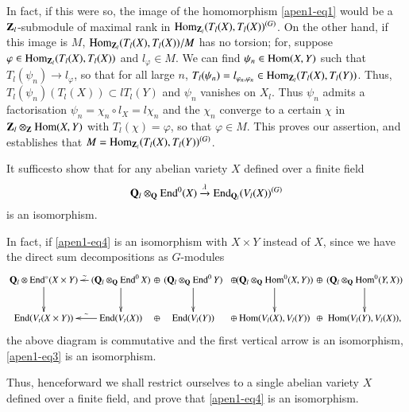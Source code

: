 In fact, if this were so, the image of the homomorphism \eqref{apen1-eq1} would be a $\mathbf{Z}_l$-submodule of maximal rank in $\operatorname{Hom}_{\mathbf{Z}_l} (T_l(X),T_l(X))^{(G)}$. On the other hand, if this image is $M$, $\operatorname{Hom}_{\mathbf{Z}_l} (T_l(X), T_l(X))/M$ has no torsion; for, suppose  $\varphi \in \operatorname{Hom}_{\mathbf{Z}_l} (T_l(X), T_l(X))$ and $l_\varphi \in M$. We can find $\psi_n \in \operatorname{Hom} (X,Y)$ such that $T_l(\psi_n) \to l_\varphi$, so that for all large $n$, $T_l (\psi_n) = l_{\varphi_n, \varphi_n} \in \operatorname{Hom}_{\mathbf{Z}_l} (T_l(X), T_l (Y))$. Thus, $T_l (\psi_n) (T_l (X)) \subset l T_l(Y)$ and $\psi_n$ vanishes on $X_l$. Thus $\psi_n$ admits a factorisation $\psi_n =\chi_n \circ l_X = l \chi_n$ and the $\chi_n$ converge to a certain $\chi$ in $\mathbf{Z}_l \otimes_{\mathbf{Z}} \operatorname{Hom} (X,Y)$ with $T_l(\chi) = \varphi$, so that $\varphi \in M$. This proves our assertion, and establishes that $M = \operatorname{Hom}_{\mathbf{Z}_l} (T_l(X), T_l(Y))^{(G)}$.

\begin{romanstep}\label{apen1-step2}
It suffices\pageoriginale to show that for any abelian variety $X$ defined over a finite field
\begin{equation}
\mathbf{Q}_l\otimes_{\mathbf{Q}} \operatorname{End}^0(X) \xrightarrow{\lambda} \operatorname{End}_{\mathbf{Q}_l} (V_l (X))^{(G)} \label{apen1-eq4}
\end{equation}
is an isomorphism.
\end{romanstep}

In fact, if \eqref{apen1-eq4} is an isomorphism with $X \times Y$ instead of $X$, since we have the direct sum decompositions as $G$-modules
{\fontsize{7}{9}\selectfont
\[
\xymatrix@C=0.28cm{
\bfQ_l \otimes \End^\circ (X \times Y) \ar[d] &  (\bfQ_l \otimes_{\bfQ} \End^0 X) \ar[d]\ar[l]_-\sim  
\ar@{}[r]|{\displaystyle\oplus} & (\bfQ_l \otimes_{\bfQ}  \End^0 Y) \ar[d] \ar@{}[r]|{\displaystyle\oplus} & (\bfQ_l \otimes_{\bfQ} \Hom^0 (X,Y)) \ar@{}[r]|{\displaystyle\oplus} \ar[d] &  (\bfQ_l \otimes_{\bfQ} \Hom^0 (Y,X)) \ar[d]\\
\End (V_t (X \times Y)) & \End(V_t(X)) \ar[l]_-\sim \ar@{}[r]|{\displaystyle\oplus} & \End (V_l (Y)) \ar@{}[r]|{\displaystyle\oplus} & \Hom (V_l(X), V_l (Y)) \ar@{}[r]|{\displaystyle\oplus} & \Hom (V_l (Y), V_l (X)),
}
\]}\relax
the above diagram is commutative and the first vertical arrow is an isomorphism, \eqref{apen1-eq3} is an isomorphism.

Thus, henceforward we shall restrict ourselves to a single abelian variety $X$ defined over a finite field, and prove that \eqref{apen1-eq4} is an isomorphism.

